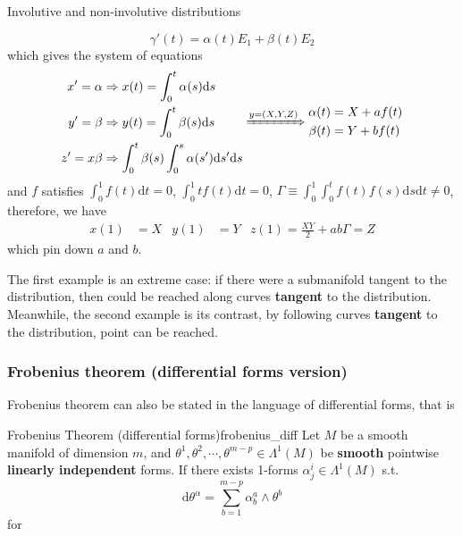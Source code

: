\begin{example}{Involutive and non-involutive distributions}
\begin{enumerate}
        $$
        \gamma'(t) = \alpha(t)E_1 + \beta(t)E_2
        $$
        which gives the system of equations
        $$
        \begin{aligned}
            x'=\alpha &\Rightarrow x(t)=\int^t_0 \alpha(s)\mathrm{d}s\\
            y'=\beta  &\Rightarrow y(t)=\int^t_0 \beta(s)\mathrm{d}s\\
            z' = x\beta &\Rightarrow \int^t_0 \beta(s) \int^s_0 \alpha(s')\mathrm{d}s' \mathrm{d}s
        \end{aligned} \xRightarrow{y=(X,Y,Z)} \begin{aligned}
            \alpha(t) &= X+af(t)\\
            \beta(t)  &= Y+bf(t)
        \end{aligned}
        $$
        and $f$ satisfies $\int^1_0 f(t)\mathrm{d}t =0$, $\int^1_0 tf(t)\mathrm{d}t = 0$, $ \Gamma \equiv \int^1_0 \int^t_0 f(t)f(s)\mathrm{d}s\mathrm{d}t\neq 0$, therefore, we have 
        \begin{align*}
            x(1) &= X & y(1)&=Y & z(1)=\frac{XY}{2}+ab\Gamma = Z
        \end{align*}
        which pin down $a$ and $b$.
    \end{enumerate}
\end{example}

The first example is an extreme case: if there were a submanifold tangent to the distribution, then  could be reached along curves \textbf{tangent} to the distribution. Meanwhile, the second example is its contrast, by following curves \textbf{tangent} to the distribution,  point can be reached.

\subsubsection*{Frobenius theorem (differential forms version)}
Frobenius theorem can also be stated in the language of differential forms, that is 
\begin{theorem}{Frobenius Theorem (differential forms)}{frobenius_diff}
    Let $M$ be a smooth manifold of dimension $m$, and $\theta^1,\theta^2,\cdots,\theta^{m-p}\in \Lambda ^1(M)$ be \textbf{smooth} pointwise \textbf{linearly independent} forms. If there exists 1-forms $\alpha_j^i \in \Lambda^1 (M)$ s.t.   
    $$
    \mathrm{d}\theta^{\alpha} = \sum^{m-p}_{b=1}\alpha_b^{a} \wedge \theta^b
    $$
    for 
\end{theorem}